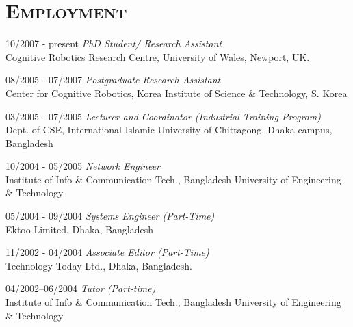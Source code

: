 \documentclass[notopicbreak,contbibnum,plain]{simplecv}
\begin{document}
\section{\textsc{Employment}}
\begin{topic}
	\item[10/2007 - present] \textit{PhD Student/ Research Assistant}\\
    Cognitive Robotics Research Centre,
    University of Wales, Newport, UK.
\vspace*{-0.1cm}    
    \item[08/2005 - 07/2007] \textit{Postgraduate Research Assistant\\}
    Center for Cognitive Robotics,
    Korea Institute of Science \& Technology, S. Korea
\vspace*{-0.1cm}
\item[03/2005 - 07/2005] \textit{Lecturer and Coordinator (Industrial Training Program)}\\
	Dept. of CSE, International Islamic University of Chittagong, Dhaka campus, Bangladesh
\vspace*{-0.1cm}    
    \item[10/2004 - 05/2005] \textit{Network Engineer}\\
	Institute of Info \& Communication Tech.,
	Bangladesh University of Engineering \& Technology
\vspace*{-0.1cm}
	\item[05/2004 - 09/2004]\textit{ Systems Engineer (Part-Time)}\\
	Ektoo Limited, Dhaka, Bangladesh
\vspace*{-0.1cm}
	\item[11/2002 - 04/2004] \textit{Associate Editor (Part-Time)}\\
	Technology Today Ltd., Dhaka, Bangladesh.
\vspace*{-0.1cm}
	\item[04/2002--06/2004] \textit{Tutor (Part-time)}\\
	 Institute of Info \& Communication Tech.,
	Bangladesh University of Engineering \& Technology        
\end{topic}
\vspace*{-0.1cm}
\end{document}

